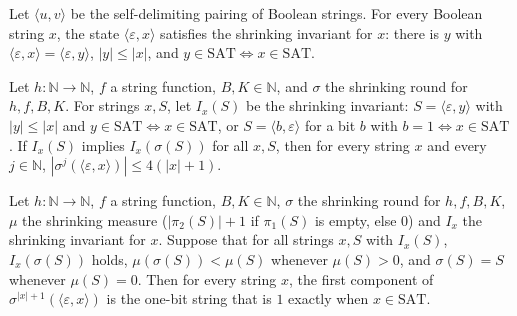 \begin{theorem}
\label{Complexity.ladner_shrink_initial}
\leanok
{}
Let $\langle u,v\rangle$ be the self-delimiting pairing of Boolean strings. For every
Boolean string $x$, the state $\langle\varepsilon,x\rangle$ satisfies the shrinking
invariant for $x$: there is $y$ with $\langle\varepsilon,x\rangle=\langle\varepsilon,y\rangle$,
$|y|\le|x|$, and $y\in\mathrm{SAT}\iff x\in\mathrm{SAT}$.
\end{theorem}

\begin{theorem}
\label{Complexity.ladner_shrink_orbit_size}
\leanok
{}
Let $h:\mathbb N\to\mathbb N$, $f$ a string function, $B,K\in\mathbb N$, and $\sigma$ the
shrinking round for $h,f,B,K$. For strings $x,S$, let $I_x(S)$ be the shrinking invariant:
$S=\langle\varepsilon,y\rangle$ with $|y|\le|x|$ and $y\in\mathrm{SAT}\iff x\in\mathrm{SAT}$,
or $S=\langle b,\varepsilon\rangle$ for a bit $b$ with $b=1\iff x\in\mathrm{SAT}$. If
$I_x(S)$ implies $I_x(\sigma(S))$ for all $x,S$, then for every string $x$ and every
$j\in\mathbb N$, $|\sigma^{j}(\langle\varepsilon,x\rangle)|\le 4(|x|+1)$.
\end{theorem}

\begin{theorem}
\label{Complexity.ladner_shrink_final_readout}
\leanok
{}
Let $h:\mathbb N\to\mathbb N$, $f$ a string function, $B,K\in\mathbb N$, $\sigma$ the
shrinking round for $h,f,B,K$, $\mu$ the shrinking measure ($|\pi_2(S)|+1$ if $\pi_1(S)$ is
empty, else $0$) and $I_x$ the shrinking invariant for $x$. Suppose that for all strings
$x,S$ with $I_x(S)$, $I_x(\sigma(S))$ holds, $\mu(\sigma(S))<\mu(S)$ whenever $\mu(S)>0$, and
$\sigma(S)=S$ whenever $\mu(S)=0$. Then for every string $x$, the first component of
$\sigma^{|x|+1}(\langle\varepsilon,x\rangle)$ is the one-bit string that is $1$ exactly when
$x\in\mathrm{SAT}$.
\end{theorem}

